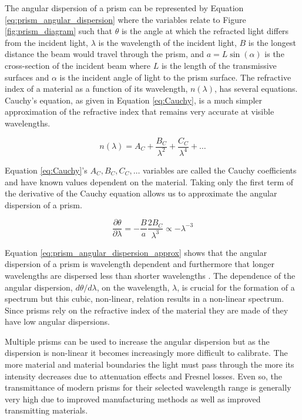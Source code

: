 The angular dispersion of a prism can be represented by Equation \ref{eq:prism_angular_dispersion} where the variables relate to Figure \ref{fig:prism_diagram} such that $\theta$ is the angle at which the refracted light differs from the incident light, $\lambda$ is the wavelength of the incident light, $B$ is the longest distance the beam would travel through the prism, and $a = L \sin(\alpha)$ is the cross-section of the incident beam where $L$ is the length of the transmissive surfaces and $\alpha$ is the incident angle of light to the prism surface. The refractive index of a material as a function of its wavelength, $n(\lambda)$, has several equations. Cauchy's equation, as given in Equation \ref{eq:Cauchy}, is a much simpler approximation of the refractive index that remains very accurate at visible wavelengths.

\begin{equation}
    n(\lambda) = A_{C} + \frac{B_{C}}{\lambda^{2}} + \frac{C_{C}}{\lambda^{4}} + \dots
    \label{eq:Cauchy}
\end{equation}

Equation \ref{eq:Cauchy}'s $A_{C}, B_{C}, C_{C}, \dots$ variables are called the Cauchy coefficients and have known values dependent on the material. Taking only the first term of the derivative of the Cauchy equation allows us to approximate the angular dispersion of a prism.

\begin{equation}
    \frac{\partial \theta}{\partial \lambda} = -\frac{B}{a}\frac{2B_{C}}{\lambda^{3}} \propto -\lambda^{-3}
    \label{eq:prism_angular_dispersion_approx}
\end{equation}

Equation \ref{eq:prism_angular_dispersion_approx} shows that the angular dispersion of a prism is wavelength dependent and furthermore that longer wavelengths are dispersed less than shorter wavelengths \citep{BirneyObsAstro, Hecht_optics}. The dependence of the angular dispersion, $d\theta/d\lambda$, on the wavelength, $\lambda$, is crucial for the formation of a spectrum but this cubic, non-linear, relation results in a non-linear spectrum. Since prisms rely on the refractive index of the material they are made of they have low angular dispersions.
\prgph

Multiple prisms can be used to increase the angular dispersion but as the dispersion is non-linear it becomes increasingly more difficult to calibrate. The more material and material boundaries the light must pass through the more its intensity decreases due to attenuation effects and Fresnel losses. Even so, the transmittance of modern prisms for their selected wavelength range is generally very high due to improved manufacturing methods as well as improved transmitting materials.
\prgph

